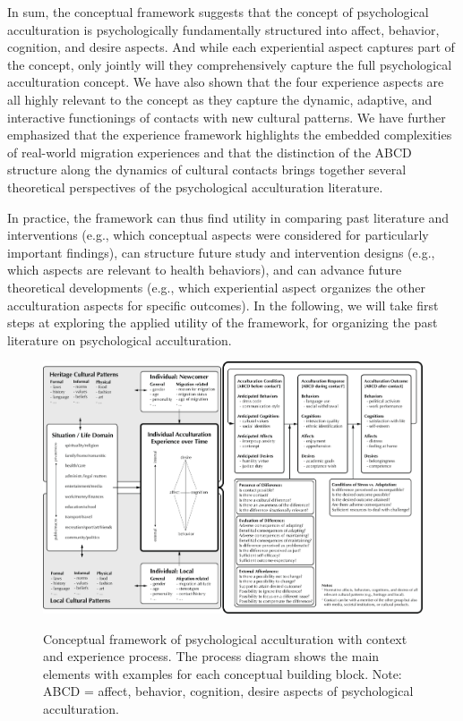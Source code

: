 \documentclass[man, 12pt, a4paper, mask]{apa7}
\begin{document}
In sum, the conceptual framework suggests that the concept of psychological acculturation is psychologically fundamentally structured into affect, behavior, cognition, and desire aspects. And while each experiential aspect captures part of the concept, only jointly will they comprehensively capture the full psychological acculturation concept. We have also shown that the four experience aspects are all highly relevant to the concept as they capture the dynamic, adaptive, and interactive functionings of contacts with new cultural patterns. We have further emphasized that the experience framework highlights the embedded complexities of real-world migration experiences and that the distinction of the ABCD structure along the dynamics of cultural contacts brings together several theoretical perspectives of the psychological acculturation literature. 

In practice, the framework can thus find utility in comparing past literature and interventions (e.g., which conceptual aspects were considered for particularly important findings), can structure future study and intervention designs (e.g., which aspects are relevant to health behaviors), and can advance future theoretical developments (e.g., which experiential aspect organizes the other acculturation aspects for specific outcomes). In the following, we will take first steps at exploring the applied utility of the framework, for organizing the past literature on psychological acculturation. 

\begin{figure}
    \centering
    \caption{Conceptual framework of psychological acculturation with context and experience process. The process diagram shows the main elements with examples for each conceptual building block. Note: ABCD = affect, behavior, cognition, desire aspects of psychological acculturation.}
    \includegraphics[width=\textwidth]{Figures/ConceptualFrameworkRevision.pdf}
    \label{fig:ModelContext}
\end{figure}
\end{document}
